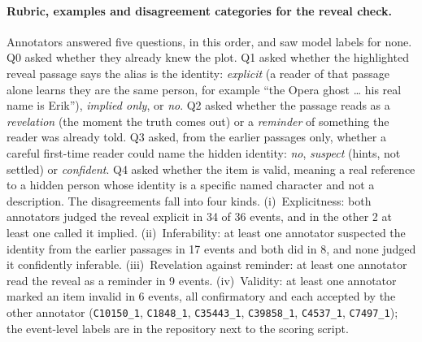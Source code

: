 \documentclass[11pt]{article}
\begin{document}
\paragraph{Rubric, examples and disagreement categories for the reveal check.} Annotators answered five questions, in this order, and saw model labels for none. Q0 asked whether they already knew the plot. Q1 asked whether the highlighted reveal passage says the alias is the identity: \emph{explicit} (a reader of that passage alone learns they are the same person, for example ``the Opera ghost \dots{} his real name is Erik''), \emph{implied only}, or \emph{no}. Q2 asked whether the passage reads as a \emph{revelation} (the moment the truth comes out) or a \emph{reminder} of something the reader was already told. Q3 asked, from the earlier passages only, whether a careful first-time reader could name the hidden identity: \emph{no}, \emph{suspect} (hints, not settled) or \emph{confident}. Q4 asked whether the item is valid, meaning a real reference to a hidden person whose identity is a specific named character and not a description. The disagreements fall into four kinds. (i)~Explicitness: both annotators judged the reveal explicit in 34 of 36 events, and in the other 2 at least one called it implied. (ii)~Inferability: at least one annotator suspected the identity from the earlier passages in 17 events and both did in 8, and none judged it confidently inferable. (iii)~Revelation against reminder: at least one annotator read the reveal as a reminder in 9 events. (iv)~Validity: at least one annotator marked an item invalid in 6 events, all confirmatory and each accepted by the other annotator (\texttt{C10150\_1}, \texttt{C1848\_1}, \texttt{C35443\_1}, \texttt{C39858\_1}, \texttt{C4537\_1}, \texttt{C7497\_1}); the event-level labels are in the repository next to the scoring script.
\end{document}
